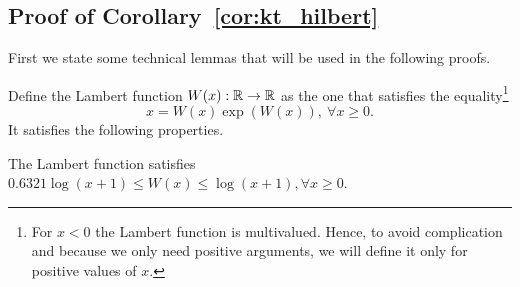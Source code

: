\subsection{Proof of Corollary~\ref{cor:kt_hilbert}}

First we state some technical lemmas that will be used in the following proofs.

Define the Lambert function $W(x):\mathbb{R}\rightarrow\mathbb{R}$ as the one that satisfies the equality\footnote{For $x<0$ the Lambert function is multivalued. Hence, to avoid complication and because we only need positive arguments, we will define it only for positive values of $x$.}
\begin{equation}
\label{eq:lambert}
x=W(x) \exp \left(W(x)\right), \ \forall x\geq0.
\end{equation}
It satisfies the following properties.
%
\begin{lemma}
\label{lemma:lambert}
The Lambert function satisfies $0.6321 \log(x+1) \leq W(x) \leq \log(x+1), \forall x\geq0$.
\end{lemma}
%
